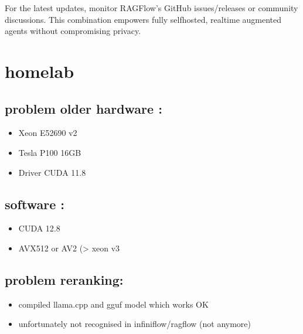\documentclass[letterpaper,10pt,english]{sphinxmanual}
\begin{document}
\sphinxAtStartPar
For the latest updates, monitor RAGFlow’s GitHub issues/releases or
community discussions. This combination empowers fully self\sphinxhyphen{}hosted,
real\sphinxhyphen{}time augmented agents without compromising privacy.

\sphinxstepscope


\chapter{homelab}
\label{\detokenize{homelab:homelab}}\label{\detokenize{homelab::doc}}

\section{problem older hardware :}
\label{\detokenize{homelab:problem-older-hardware}}\begin{itemize}
\item {} 
\sphinxAtStartPar
Xeon E5\sphinxhyphen{}2690 v2

\item {} 
\sphinxAtStartPar
Tesla P100 16GB

\item {} 
\sphinxAtStartPar
Driver CUDA 11.8

\end{itemize}


\section{software :}
\label{\detokenize{homelab:software}}\begin{itemize}
\item {} 
\sphinxAtStartPar
CUDA 12.8

\item {} 
\sphinxAtStartPar
AVX512 or AV2 (\textgreater{} xeon v3

\end{itemize}


\section{problem reranking:}
\label{\detokenize{homelab:problem-reranking}}\begin{itemize}
\item {} 
\sphinxAtStartPar
compiled llama.cpp and gguf model which works OK

\item {} 
\sphinxAtStartPar
unfortunately not recognised in infiniflow/ragflow (not anymore)

\end{itemize}
\end{document}

